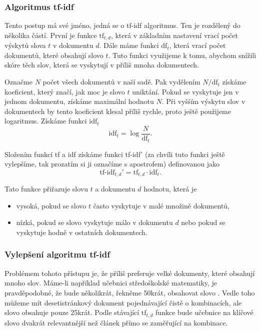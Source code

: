 \documentclass[12pt]{article}
\begin{document}
\subsubsection{Algoritmus tf-idf}
Tento postup má své jméno, jedná se o tf-idf algoritmus. Ten je rozdělený do několika částí. První je funkce $\mbox{tf}_{t,d}$, která v základním nastavení vrací počet výskytů slova $t$ v dokumentu $d$. Dále máme funkci $\mbox{df}_t$, která vrací počet dokumentů, které obsahují slovo $t$. Tuto funkci využijeme k tomu, abychom snížili skóre těch slov, která se vyskytují v příliš mnoha dokumentech. 

Označme $N$ počet všech dokumentů v naší sadě. Pak vydělením $N/\mbox{df}_t$ získáme koeficient, který značí, jak moc je slovo $t$ uniktání. Pokud se vyskytuje jen v jednom dokumentu, získáme maximální hodnotu $N$. Při vyšším výskytu slov v dokumentech by tento koeficient klesal příliš rychle, proto ještě použijeme logaritmus. Získáme funkci $\mbox{idf}_t$
$$\mbox{idf}_t=\log\frac{N}{\mbox{df}_t}.$$

Složením funkcí tf a idf získáme funkci tf-idf' (za chvíli tuto funkci ještě vylepšíme, tak prozatím si ji označíme s apostrofem) definovanou jako
$$\mbox{tf-idf}_{t,d}'=\mbox{tf}_{t,d}\cdot\mbox{idf}_t.$$

Tato funkce přiřazuje slovu $t$ a dokumentu $d$ hodnotu, která je

\begin{itemize}
\item vysoká, pokud se slovo $t$ často vyskytuje v malé množině dokumentů,
\item nízká, pokud se slovo vyskytuje málo v dokumentu $d$ nebo pokud se vyskytuje hodně v ostatních dokumentech.
\end{itemize}

\subsubsection{Vylepšení algoritmu tf-idf}

Problémem tohoto přístupu je, že příliš preferuje velké dokumenty, které obsahují mnoho slov. Máme-li například učebnici středoškolské matematiky, je pravděpodobné, že bude několikrát, řekněme 50krát, obsahovat slovo . Vedle toho můžeme mít desetistránkový dokument pojednávající čistě o kombinacích, ale slovo  obsahuje pouze 25krát. Podle stávající $\mbox{tf}_{t,d}$ funkce bude učebnice na klíčové slovo  dvakrát relevantnější než článek přímo se zaměřující na kombinace. 
\end{document}
